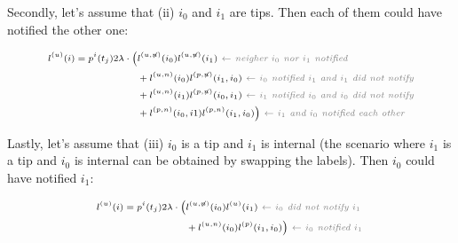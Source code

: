 \documentclass[a4paper,10pt]{article}
\begin{document}
Secondly, let's assume that (ii) $i_0$ and $i_1$ are tips. Then each of them could have notified the other one:

\begin{equation}
\scriptsize
\begin{split}
l^{(u)}(i) = p^{i}(t_j) 2\lambda \cdot 
\Big(&l^{(u,\not{n})}(i_0)l^{(u,\not{n})}(i_1) \textit{\color{gray}~$\leftarrow$ neigher $i_0$ nor $i_1$ notified} \\
&+ l^{(u,n)}(i_0)l^{(p,\not{n})}(i_1,i_0) \textit{\color{gray}~$\leftarrow$ $i_0$ notified $i_1$ and $i_1$ did not notify} \\
&+ l^{(u,n)}(i_1)l^{(p,\not{n})}(i_0,i_1) \textit{\color{gray}~$\leftarrow$ $i_1$ notified $i_0$ and $i_0$ did not notify} \\
&+ l^{(p,n)}(i_0,i1)l^{(p,n)}(i_1,i_0)\Big) \textit{\color{gray}~$\leftarrow$ $i_1$ and $i_0$ notified each other} \\
\end{split}\label{eq:lu-tip-tip}
\end{equation}

Lastly, let's assume that (iii) $i_0$ is a tip and $i_1$ is internal (the scenario where $i_1$ is a tip and $i_0$ is internal can be obtained by swapping the labels). Then $i_0$ could have notified $i_1$:


\begin{equation}
\scriptsize
\begin{split}
l^{(u)}(i) = p^{i}(t_j) 2\lambda \cdot 
\Big(&l^{(u,\not{n})}(i_0)l^{(u)}(i_1) \textit{\color{gray}~$\leftarrow$ $i_0$ did not notify $i_1$ } \\
&+ l^{(u,n)}(i_0)l^{(p)}(i_1,i_0)\Big) \textit{\color{gray}~$\leftarrow$ $i_0$ notified $i_1$} \\
\end{split}\label{eq:lu-int-tip}
\end{equation}
\end{document}
